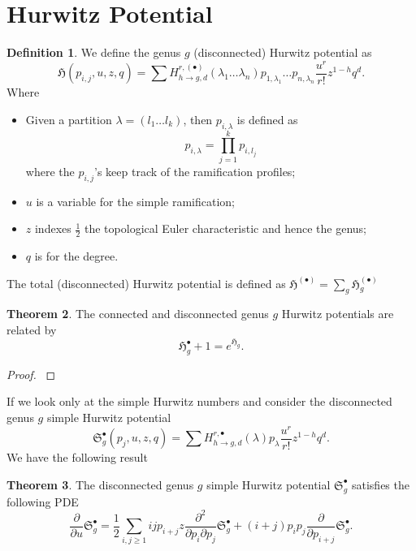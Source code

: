 \documentclass[12pt,a4paper,openright,twoside]{report}
\theoremstyle{definition} %
\newtheorem{theorem}{Theorem}[chapter]
\newtheorem{definition}[theorem]{Definition}
\def \de {\partial}
\def \H {\mathfrak{H}}
\begin{document}
\section{Hurwitz Potential}

\begin{definition}
    We define the genus \(g\) (disconnected) Hurwitz potential as
    \[
    \H(p_{i,j}, u, z, q) = \sum H^{r, (\bullet)}_{h \to g, d}(\lambda_1 \ldots \lambda_n) p_{1,\lambda_1} \ldots p_{n,\lambda_n} \frac{u^r}{r!}z^{1-h}q^d.
    \]
    Where
    \begin{itemize}
        \item Given a partition \(\lambda = (l_1 \ldots l_k)\), then \(p_{i,\lambda}\) is defined as
        \[
        p_{i,\lambda} = \prod_{j=1}^k p_{i,l_j}
        \]
        where the \(p_{i,j}\)'s keep track of the ramification profiles;
        \item \(u\) is a variable for the simple ramification;
        \item \(z\) indexes \(\frac{1}{2}\) the topological Euler characteristic and hence the genus;
        \item \(q\) is for the degree.
    \end{itemize}

    The total (disconnected) Hurwitz potential is defined as \(\H^{(\bullet)} = \sum_{g} \H^{(\bullet)}_g\)
\end{definition}

\begin{theorem}
    The connected and disconnected genus \(g\) Hurwitz potentials are related by
    \[
    \H_g^{\bullet} + 1 = e^{\H_g}.
    \]
\end{theorem}

\begin{proof}
    \cite[Ch. 10, Thm. 10.2.1, p. 134]{CM16}
\end{proof}

If we look only at the simple Hurwitz numbers and consider the disconnected genus \(g\) simple Hurwitz potential
\[
\mathfrak{S}^{\bullet}_g(p_j,u,z,q) = \sum H^{r, \bullet}_{h \to g, d}(\lambda) p_{\lambda}\frac{u^r}{r!}z^{1-h}q^d.
\]
We have the following result

\begin{theorem}
    The disconnected genus \(g\) simple Hurwitz potential \(\mathfrak{S}^{\bullet}_g\) satisfies the following PDE
    \[
    \frac{\de}{\de u} \mathfrak{S}^{\bullet}_g = \frac{1}{2} \sum_{i,j \geq 1} ij p_{i+j}z \frac{\de^2}{\de p_i \de p_j} \mathfrak{S}^{\bullet}_g + (i + j) p_i p_j \frac{\de}{\de p_{i+j}} \mathfrak{S}^{\bullet}_g.
    \]
\end{theorem}
\end{document}
